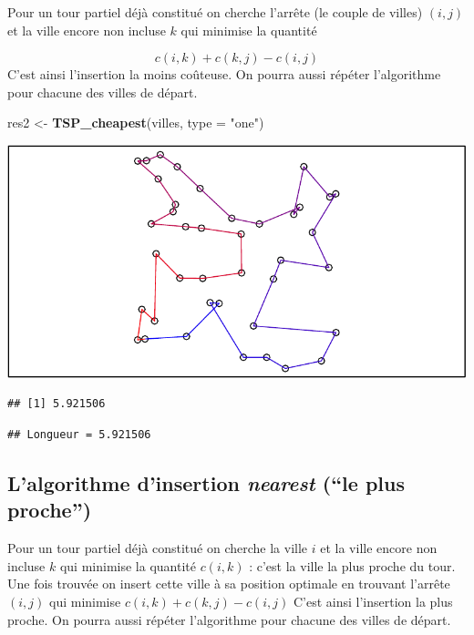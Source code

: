 \documentclass[
]{article}
\newenvironment{Shaded}{\begin{snugshade}}{\end{snugshade}}
\newcommand{\AttributeTok}[1]{\textcolor[rgb]{0.13,0.29,0.53}{#1}}
\newcommand{\FunctionTok}[1]{\textcolor[rgb]{0.13,0.29,0.53}{\textbf{#1}}}
\newcommand{\NormalTok}[1]{#1}
\newcommand{\OtherTok}[1]{\textcolor[rgb]{0.56,0.35,0.01}{#1}}
\newcommand{\StringTok}[1]{\textcolor[rgb]{0.31,0.60,0.02}{#1}}
\begin{document}
Pour un tour partiel déjà constitué on cherche l'arrête (le couple de
villes) \((i,j)\) et la ville encore non incluse \(k\) qui minimise la
quantité

\[c(i,k) + c(k,j) - c(i,j)\] C'est ainsi l'insertion la moins coûteuse.
On pourra aussi répéter l'algorithme pour chacune des villes de départ.

\begin{Shaded}
\begin{Highlighting}[]
\NormalTok{res2 }\OtherTok{\textless{}{-}} \FunctionTok{TSP\_cheapest}\NormalTok{(villes, }\AttributeTok{type =} \StringTok{"one"}\NormalTok{)}
\end{Highlighting}
\end{Shaded}

\includegraphics{TSP_analyse_files/figure-latex/unnamed-chunk-7-1.pdf}

\begin{verbatim}
## [1] 5.921506
\end{verbatim}

\begin{verbatim}
## Longueur = 5.921506
\end{verbatim}

\subsection{\texorpdfstring{L'algorithme d'insertion \emph{nearest}
(``le plus
proche'')}{L'algorithme d'insertion nearest (``le plus proche'')}}\label{lalgorithme-dinsertion-nearest-le-plus-proche}

Pour un tour partiel déjà constitué on cherche la ville \(i\) et la
ville encore non incluse \(k\) qui minimise la quantité \(c(i,k)\) :
c'est la ville la plus proche du tour. Une fois trouvée on insert cette
ville à sa position optimale en trouvant l'arrête \((i,j)\) qui minimise
\(c(i,k) + c(k,j) - c(i,j)\) C'est ainsi l'insertion la plus proche. On
pourra aussi répéter l'algorithme pour chacune des villes de départ.
\end{document}

